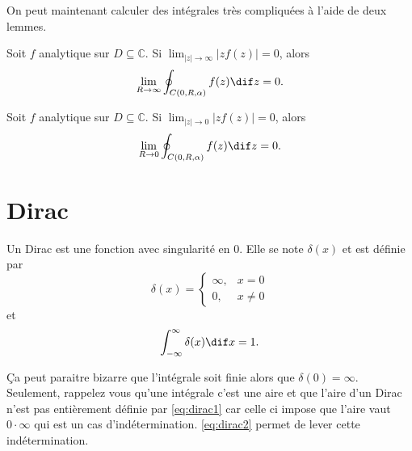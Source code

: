 On peut maintenant calculer des intégrales très compliquées à l'aide de
deux lemmes.
\begin{mylem}
  Soit $f$ analytique sur $D \subseteq \mathbb{C}$.
  Si $\lim_{|z|\to\infty} |zf(z)| = 0$, alors
  \[ \lim_{R\to\infty} \oint_{C(0,R,\alpha)}f(z)\dif z = 0. \]
\end{mylem}
\begin{mylem}
  Soit $f$ analytique sur $D \subseteq \mathbb{C}$.
  Si $\lim_{|z|\to 0} |zf(z)| = 0$, alors
  \[ \lim_{R\to 0} \oint_{C(0,R,\alpha)}f(z)\dif z = 0. \]
\end{mylem}

\annexe
\section{Dirac}
\label{app:dirac}
Un Dirac est une fonction avec singularité en 0.
Elle se note $\delta(x)$ et est définie par
\begin{equation}
  \label{eq:dirac1}
  \delta(x) =
  \begin{cases}
    \infty, & x = 0\\
    0, & x \neq 0
  \end{cases}
\end{equation}
et
\begin{equation}
  \label{eq:dirac2}
  \int_{-\infty}^{\infty} \delta(x) \dif x = 1.
\end{equation}

Ça peut paraitre bizarre que l'intégrale soit finie alors que
$\delta(0) = \infty$.
Seulement, rappelez vous qu'une intégrale c'est une aire et que
l'aire d'un Dirac n'est pas entièrement définie par \eqref{eq:dirac1}
car celle ci impose que l'aire vaut $0 \cdot \infty$ qui est un cas
d'indétermination.
\eqref{eq:dirac2} permet de lever cette indétermination.

